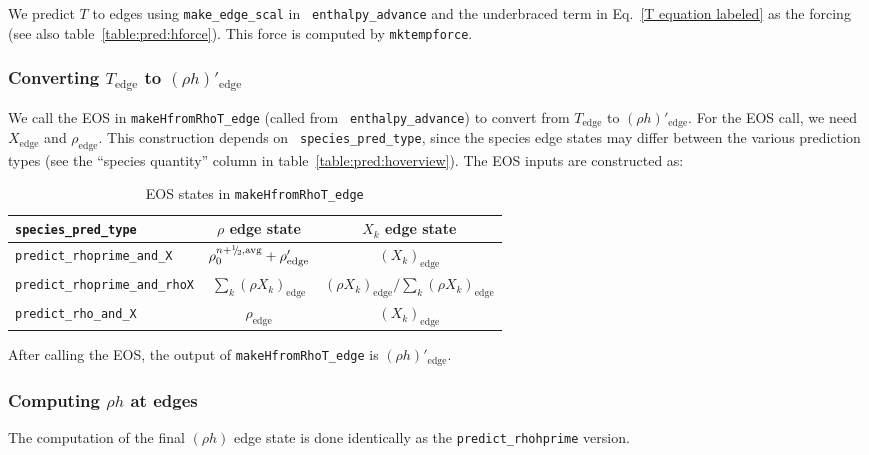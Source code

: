 We predict $T$ to edges using {\tt make\_edge\_scal} in {\tt
  enthalpy\_advance} and the underbraced term in Eq.~\ref{T equation
  labeled} as the forcing (see also table~\ref{table:pred:hforce}).
This force is computed by {\tt mktempforce}.

\subsubsection{Converting $T_\mathrm{edge}$ to $(\rho h)'_\mathrm{edge}$}

We call the EOS in {\tt makeHfromRhoT\_edge} (called from {\tt
  enthalpy\_advance}) to convert from $T_\mathrm{edge}$ to $(\rho
h)'_\mathrm{edge}$.  For the EOS call, we need $X_\mathrm{edge}$ and
$\rho_\mathrm{edge}$.  This construction depends on {\tt
  species\_pred\_type}, since the species edge states may differ
between the various prediction types (see the ``species quantity''
column in table~\ref{table:pred:hoverview}).  The EOS inputs are
constructed as:

\begin{table*}[h]
\centering
\caption{EOS states in {\tt makeHfromRhoT\_edge}}
\label{table:pred:EOSinputs}
\renewcommand{\arraystretch}{1.5}
\begin{tabular}{l|c|c}
\hline
\hline
{\tt species\_pred\_type} & {$\rho$ edge state} &   {$X_k$ edge state}  \\
\hline
{\tt predict\_rhoprime\_and\_X} & 
  $\rho_0^{n+\myhalf,\rm{avg}} + \rho'_\mathrm{edge}$ & 
  $(X_k)_\mathrm{edge}$ \\
{\tt predict\_rhoprime\_and\_rhoX} & 
  $\sum_k (\rho X_k)_\mathrm{edge}$ & 
  $(\rho X_k)_\mathrm{edge}/\sum_k (\rho X_k)_\mathrm{edge}$ \\
{\tt predict\_rho\_and\_X} & 
  $\rho_\mathrm{edge}$ & 
  $(X_k)_\mathrm{edge}$ \\
\hline
\end{tabular}
\end{table*}

After calling the EOS, the output of {\tt makeHfromRhoT\_edge} is
$(\rho h)'_\mathrm{edge}$.

\subsubsection{Computing $\rho h$ at edges}

The computation of the final $(\rho h)$ edge state is done identically
as the {\tt predict\_rhohprime} version.



